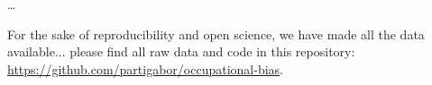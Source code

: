 \documentclass[11pt]{article}
\begin{document}
\dots

For the sake of reproducibility and open science, we have made all the data available... please find all raw data and code in this repository: \href{https://github.com/partigabor/occupational-bias}{https://github.com/partigabor/occupational-bias}.


\medskip










\end{document}
